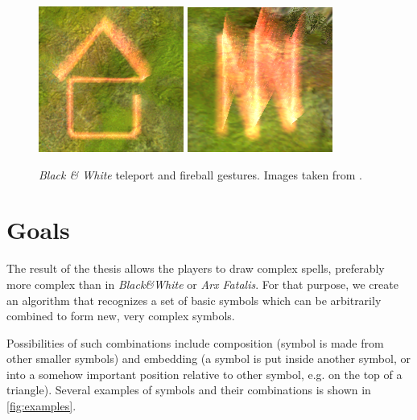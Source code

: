 \begin{description}
\begin{figure}
\centering
\includegraphics[width=.3\linewidth]{ext/gestureteleport.png}
\quad
\includegraphics[width=.3\linewidth]{ext/gesturefireball.png}
\caption{\emph{Black \& White} teleport and fireball gestures. Images taken from \citet{bandw}.}
\label{fig:blackwhite}
\end{figure}

\end{description}

\section{Goals}

The result of the thesis allows the players to draw complex spells, preferably more complex than in \emph{Black\&White} or \emph{Arx Fatalis}. For that purpose, we create an algorithm that recognizes a set of basic symbols which can be arbitrarily combined to form new, very complex symbols.

Possibilities of such combinations include composition (symbol is made from other smaller symbols) and embedding (a symbol is put inside another symbol, or into a somehow important position relative to other symbol, e.g. on the top of a triangle). Several examples of symbols and their combinations is shown in \cref{fig:examples}.

